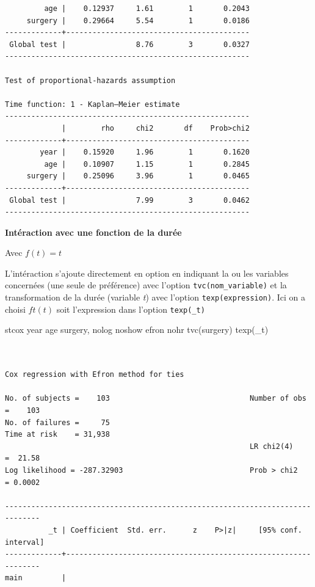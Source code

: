 \documentclass[
  12pt,
  letterpaper,
  DIV=11,
  numbers=noendperiod,
  onepage,
  openany]{scrreprt}
\newenvironment{Shaded}{\begin{snugshade}}{\end{snugshade}}
\newcommand{\FunctionTok}[1]{\textcolor[rgb]{0.94,0.94,0.56}{#1}}
\newcommand{\KeywordTok}[1]{\textcolor[rgb]{0.94,0.87,0.69}{#1}}
\newcommand{\NormalTok}[1]{\textcolor[rgb]{0.80,0.80,0.80}{#1}}
\begin{document}
\begin{verbatim}
         age |    0.12937     1.61        1       0.2043
     surgery |    0.29664     5.54        1       0.0186
-------------+------------------------------------------
 Global test |                8.76        3       0.0327
--------------------------------------------------------

Test of proportional-hazards assumption

Time function: 1 - Kaplan–Meier estimate
--------------------------------------------------------
             |        rho     chi2       df    Prob>chi2
-------------+------------------------------------------
        year |    0.15920     1.96        1       0.1620
         age |    0.10907     1.15        1       0.2845
     surgery |    0.25096     3.96        1       0.0465
-------------+------------------------------------------
 Global test |                7.99        3       0.0462
--------------------------------------------------------
\end{verbatim}

\textbf{Intéraction avec une fonction de la durée}

Avec \(f(t)=t\)

L'intéraction s'ajoute directement en option en indiquant la ou les
variables concernées (une seule de préférence) avec l'option
\texttt{tvc(nom\_variable)} et la transformation de la durée (variable
\emph{t}) avec l'option \texttt{texp(expression)}. Ici on a choisi
\(ft(t)\) soit l'expression dans l'option \texttt{texp(\_t)}

\begin{Shaded}
\begin{Highlighting}[]
\KeywordTok{stcox} \FunctionTok{year}\NormalTok{ age surgery, }\KeywordTok{nolog}\NormalTok{ noshow efron nohr tvc(surgery) texp(\_t)}
\end{Highlighting}
\end{Shaded}

\begin{verbatim}


Cox regression with Efron method for ties

No. of subjects =    103                                Number of obs =    103
No. of failures =     75
Time at risk    = 31,938
                                                        LR chi2(4)    =  21.58
Log likelihood = -287.32903                             Prob > chi2   = 0.0002

------------------------------------------------------------------------------
          _t | Coefficient  Std. err.      z    P>|z|     [95% conf. interval]
-------------+----------------------------------------------------------------
main         |
\end{verbatim}
\end{document}
